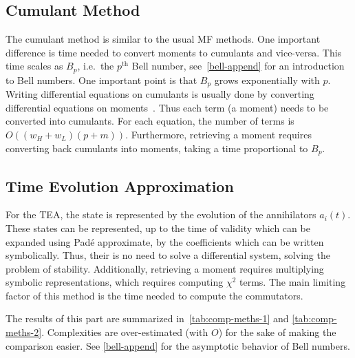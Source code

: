 \subsection{Cumulant Method}
The cumulant method is similar to the usual MF methods. One important difference is time needed to convert moments to cumulants and vice-versa. This time scales as $B_p$, i.e.\@~the $p^{\text{th}}$ Bell number, see~\autoref{bell-append} for an introduction to Bell numbers. One important point is that $B_p$ grows exponentially with $p$. Writing differential equations on cumulants is usually done by converting differential equations on moments~\cite{khan2021physical}. Thus each term (a moment) needs to be converted into cumulants. For each equation, the number of terms is $O((w_H + w_L) (p+m))$. Furthermore, retrieving a moment requires converting back cumulants into moments, taking  a time proportional to $B_p$.

\subsection{Time Evolution Approximation}

For the TEA, the state is represented by the evolution of the annihilators $a_i(t)$. These states can be represented, up to the time of validity which can be expanded using Padé approximate, by the coefficients which can be written symbolically. Thus, their is no need to solve a differential system, solving the problem of stability. Additionally, retrieving a moment requires multiplying symbolic representations, which requires computing $\chi^2$ terms. The main limiting factor of this method is the time needed to compute the commutators. 

The results of this part are summarized in~\autoref{tab:comp-meths-1} and \autoref{tab:comp-meths-2}. Complexities are over-estimated (with $O$) for the sake of making the comparison easier. See \autoref{bell-append} for the asymptotic behavior of Bell numbers.

